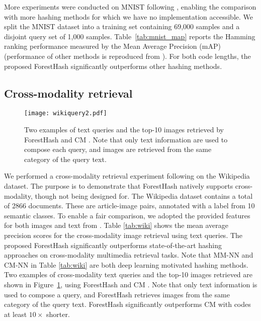 \documentclass[runningheads]{llncs}
\begin{document}
More experiments were conducted on MNIST following \cite{AGH}, enabling the
comparison with more hashing methods for which we have no implementation
accessible. We split the MNIST dataset into a training set containing 69,000
samples and a disjoint query set of 1,000 samples. Table~\ref{tab:mnist_map}
reports the Hamming ranking performance measured by the Mean Average Precision
(mAP) (performance of other methods is reproduced from \cite{AGH}).  For both
code lengths, the proposed ForestHash significantly outperforms other hashing
methods.


\subsection{Cross-modality retrieval}

\begin{figure}[t]
\centering
 \texttt{[image: wikiquery2.pdf]}
\caption{Two examples of text queries and the top-10 images retrieved by
  ForestHash and CM \cite{wikixmod}.  Note that only text information are used
  to compose each query, and images are retrieved from the same category of the
  query text.  }
\label{fig:wiki}
\end{figure}

We performed a cross-modality retrieval experiment following \cite{MM-NN,
  wikixmod} on the Wikipedia dataset.  The purpose is to demonstrate that
ForestHash natively supports cross-modality, though not being designed for.  The Wikipedia dataset contains a
total of 2866 documents. These are article-image pairs, annotated with a label
from 10 semantic classes.  To enable a fair comparison, we adopted the provided
features for both images and text from \cite{wikixmod}.  Table \ref{tab:wiki}
shows the mean average precision scores for the cross-modality image retrieval
using text queries.  The proposed ForestHash significantly outperforms
state-of-the-art hashing approaches on cross-modality multimedia retrieval
tasks. Note that MM-NN and CM-NN \cite{MM-NN} in Table \ref{tab:wiki} are both
deep learning motivated hashing methods.  Two examples of cross-modality text
queries and the top-10 images retrieved are shown in Figure~\ref{fig:wiki},
using ForestHash and CM \cite{wikixmod}.  Note that only text information is
used to compose a query, and ForestHash retrieves images from the same category
of the query text. ForestHash significantly outperforms CM with codes at least
$10 \times$ shorter.
\end{document}
